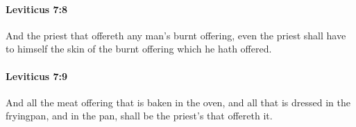 		\paragraph{Leviticus 7:8} %
			\label{LEVITICUS-7-8}

			And the priest that offereth any man’s burnt offering, even the priest shall have to himself the skin of the burnt offering which he hath offered.


		\paragraph{Leviticus 7:9} %
			\label{LEVITICUS-7-9}

			And all the meat offering that is baken in the oven, and all that is dressed in the fryingpan, and in the pan, shall be the priest’s that offereth it.


